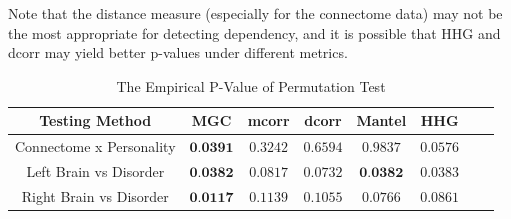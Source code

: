 \documentclass[11pt]{article}
\begin{document}

Note that the distance measure (especially for the connectome data) may not be the most appropriate for detecting dependency, and it is possible that HHG and dcorr may yield better p-values under different metrics.

\begin{table}[!t]
\footnotesize
\renewcommand{\arraystretch}{0.5}
\centering
{\begin{tabular}{|c||c|c|c|c|c|c|c|}
\hline
Testing Method & MGC & mcorr & dcorr & Mantel & HHG \\
\hline
Connectome x Personality & $\textbf{0.0391}$ & $0.3242$ & $0.6594$ & $0.9837$  & $0.0576$ \\
\hline
Left Brain vs Disorder  & $\textbf{0.0382}$ & $0.0817$ & $0.0732$ & $\textbf{0.0382}$ & $0.0383$ \\
\hline
Right Brain vs Disorder & $\textbf{0.0117}$ & $0.1139$ & $0.1055$  & $0.0766$ & $0.0861$\\
\hline
\end{tabular}
\caption{The Empirical P-Value of Permutation Test}
\label{table1}
}
\end{table}
\end{document}
